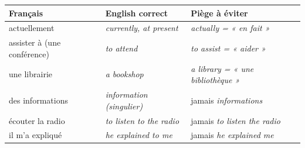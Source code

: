 \documentclass[11pt]{article}
\newcommand{\eng}[1]{\ifmmode\text{\textit{#1}}\else\begingroup\selectlanguage{english}\itshape #1\endgroup\fi}
\begin{document}
\begin{center}
\begin{tabularx}{\linewidth}{|X|X|X|}
\hline
\rowcolor{popblueL} \textbf{Français} & \textbf{English correct} & \textbf{Piège à éviter} \\
\hline
actuellement & \eng{currently, at present} & \eng{actually} = « en fait » \\
\hline
assister à (une conférence) & \eng{to attend} & \eng{to assist} = « aider » \\
\hline
une librairie & \eng{a bookshop} & \eng{a library} = « une bibliothèque » \\
\hline
des informations & \eng{information} (singulier) & jamais \eng{informations} \\
\hline
écouter la radio & \eng{to listen to the radio} & jamais \eng{to listen the radio} \\
\hline
il m'a expliqué & \eng{he explained to me} & jamais \eng{he explained me} \\
\hline
\end{tabularx}
\end{center}
\end{document}
